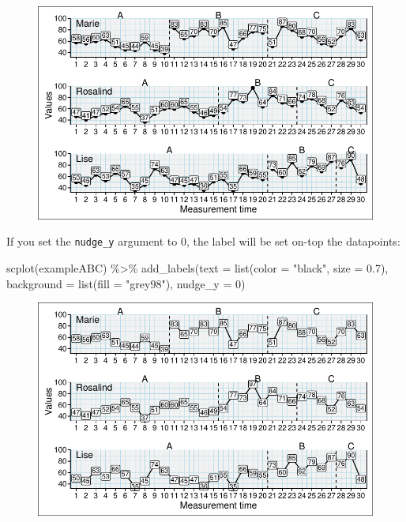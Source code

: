 \documentclass[
  letterpaper,
  DIV=11,
  numbers=noendperiod]{scrreprt}
\newenvironment{Shaded}{\begin{snugshade}}{\end{snugshade}}
\newcommand{\AttributeTok}[1]{\textcolor[rgb]{0.40,0.45,0.13}{#1}}
\newcommand{\DecValTok}[1]{\textcolor[rgb]{0.68,0.00,0.00}{#1}}
\newcommand{\FloatTok}[1]{\textcolor[rgb]{0.68,0.00,0.00}{#1}}
\newcommand{\FunctionTok}[1]{\textcolor[rgb]{0.28,0.35,0.67}{#1}}
\newcommand{\NormalTok}[1]{\textcolor[rgb]{0.00,0.23,0.31}{#1}}
\newcommand{\SpecialCharTok}[1]{\textcolor[rgb]{0.37,0.37,0.37}{#1}}
\newcommand{\StringTok}[1]{\textcolor[rgb]{0.13,0.47,0.30}{#1}}
\begin{document}
\begin{figure}[H]

{\centering \includegraphics{./ch_scplot_files/figure-pdf/valuelabels1-1.pdf}

}

\end{figure}

If you set the \texttt{nudge\_y} argument to 0, the label will be set
on-top the datapoints:

\begin{Shaded}
\begin{Highlighting}[]
\FunctionTok{scplot}\NormalTok{(exampleABC) }\SpecialCharTok{\%\textgreater{}\%} 
  \FunctionTok{add\_labels}\NormalTok{(}\AttributeTok{text =} \FunctionTok{list}\NormalTok{(}\AttributeTok{color =} \StringTok{"black"}\NormalTok{, }\AttributeTok{size =} \FloatTok{0.7}\NormalTok{), }
             \AttributeTok{background =} \FunctionTok{list}\NormalTok{(}\AttributeTok{fill =} \StringTok{"grey98"}\NormalTok{), }\AttributeTok{nudge\_y =} \DecValTok{0}\NormalTok{)}
\end{Highlighting}
\end{Shaded}

\begin{figure}[H]

{\centering \includegraphics{./ch_scplot_files/figure-pdf/valuelabels2-1.pdf}

}

\end{figure}
\end{document}
